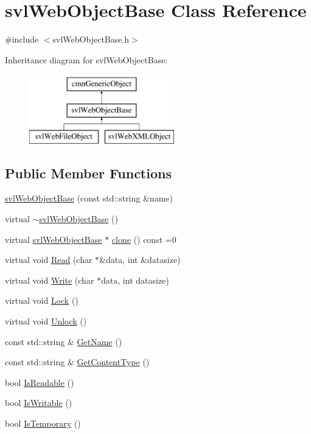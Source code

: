 \hypertarget{classsvl_web_object_base}{\section{svl\-Web\-Object\-Base Class Reference}
\label{classsvl_web_object_base}
}


{\ttfamily \#include $<$svl\-Web\-Object\-Base.\-h$>$}

Inheritance diagram for svl\-Web\-Object\-Base\-:\begin{figure}[H]
\begin{center}
\leavevmode
\includegraphics[height=3.000000cm]{de/d57/classsvl_web_object_base}
\end{center}
\end{figure}
\subsection*{Public Member Functions}
\begin{DoxyCompactItemize}
\item 
\hyperlink{classsvl_web_object_base_ae3ba6123950f112821811395f3a42f2e}{svl\-Web\-Object\-Base} (const std\-::string \&name)
\item 
virtual \hyperlink{classsvl_web_object_base_a4fba598ea7687c06b6eb4a77f38eb881}{$\sim$svl\-Web\-Object\-Base} ()
\item 
virtual \hyperlink{classsvl_web_object_base}{svl\-Web\-Object\-Base} $\ast$ \hyperlink{classsvl_web_object_base_a8a9e2f2793eb4584b276fd5cfe3a6f1a}{clone} () const =0
\item 
virtual void \hyperlink{classsvl_web_object_base_a1add3cb5a22e1c3962e56c4bfd278d0b}{Read} (char $\ast$\&data, int \&datasize)
\item 
virtual void \hyperlink{classsvl_web_object_base_aba1bc2e58179cde28f5f9fa1622b8434}{Write} (char $\ast$data, int datasize)
\item 
virtual void \hyperlink{classsvl_web_object_base_a2f317f5884d701cc75dd7b9c876101b0}{Lock} ()
\item 
virtual void \hyperlink{classsvl_web_object_base_afae8d1a4e397b70b0741b537489c9ffc}{Unlock} ()
\item 
const std\-::string \& \hyperlink{classsvl_web_object_base_acbda95cd03202f5d40811efa4077d3ee}{Get\-Name} ()
\item 
const std\-::string \& \hyperlink{classsvl_web_object_base_a79e7485303bf21bc715fd434943b99f7}{Get\-Content\-Type} ()
\item 
bool \hyperlink{classsvl_web_object_base_a14312b9c102e7b37e6b8cb7e03bbd20c}{Is\-Readable} ()
\item 
bool \hyperlink{classsvl_web_object_base_a99ef90dda8e58afaa04a2b90fc86704b}{Is\-Writable} ()
\item 
bool \hyperlink{classsvl_web_object_base_a80f51eaa56004ef934f5185b7e10c93a}{Is\-Temporary} ()
\end{DoxyCompactItemize}
